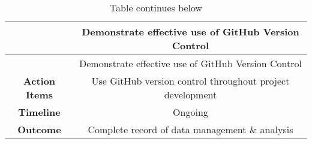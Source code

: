 \documentclass[]{elsarticle} %
\begin{document}
\begin{longtable}[]{@{}cc@{}}
\caption{Table continues below}\tabularnewline
\toprule
\begin{minipage}[b]{0.25\columnwidth}\centering\strut
~\strut
\end{minipage} & \begin{minipage}[b]{0.42\columnwidth}\centering\strut
Demonstrate effective use of GitHub Version Control\strut
\end{minipage}\tabularnewline
\midrule
\endfirsthead
\toprule
\begin{minipage}[b]{0.25\columnwidth}\centering\strut
~\strut
\end{minipage} & \begin{minipage}[b]{0.42\columnwidth}\centering\strut
Demonstrate effective use of GitHub Version Control\strut
\end{minipage}\tabularnewline
\midrule
\endhead
\begin{minipage}[t]{0.25\columnwidth}\centering\strut
\textbf{Action Items}\strut
\end{minipage} & \begin{minipage}[t]{0.42\columnwidth}\centering\strut
Use GitHub version control throughout project development\strut
\end{minipage}\tabularnewline
\begin{minipage}[t]{0.25\columnwidth}\centering\strut
\textbf{Timeline}\strut
\end{minipage} & \begin{minipage}[t]{0.42\columnwidth}\centering\strut
Ongoing\strut
\end{minipage}\tabularnewline
\begin{minipage}[t]{0.25\columnwidth}\centering\strut
\textbf{Outcome}\strut
\end{minipage} & \begin{minipage}[t]{0.42\columnwidth}\centering\strut
Complete record of data management \& analysis\strut
\end{minipage}\tabularnewline
\bottomrule
\end{longtable}
\end{document}
